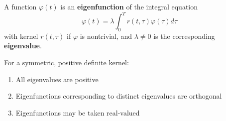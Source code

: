 A function $\varphi(t)$ is an \textbf{eigenfunction} of the integral equation
$$\varphi(t) = \lambda \int_0^T r(t, \tau) \varphi(\tau) d\tau$$
with kernel $r(t, \tau)$ if $\varphi$ is nontrivial, and $\lambda \neq 0$ is the corresponding \textbf{eigenvalue}.

For a symmetric, positive definite kernel:
\begin{enumerate}
\item All eigenvalues are positive
\item Eigenfunctions corresponding to distinct eigenvalues are orthogonal
\item Eigenfunctions may be taken real-valued
\end{enumerate}
